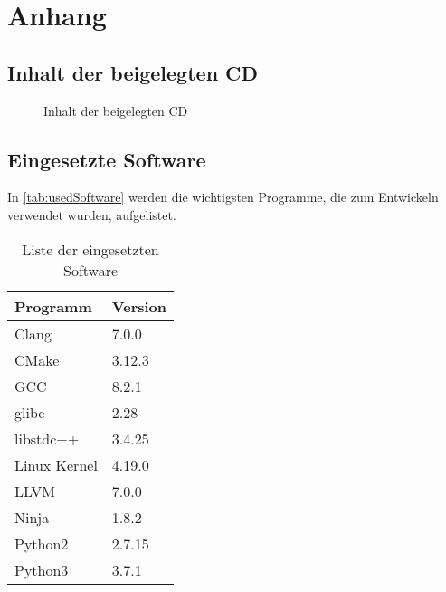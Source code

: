\section{Anhang}
\subsection*{Inhalt der beigelegten CD}
\begin{figure}[H]

\caption{Inhalt der beigelegten CD}
\label{fig:cd}
\end{figure}

\subsection*{Eingesetzte Software}

In \autoref{tab:usedSoftware} werden die wichtigsten Programme, die zum Entwickeln verwendet wurden, aufgelistet.

\begin{table}[H]
\centering
\caption{Liste der eingesetzten Software}
\label{tab:usedSoftware}
\begin{tabular}{ll}
\hline
Programm       & Version      \\ \hline
Clang          & 7.0.0        \\
CMake          & 3.12.3       \\
GCC            & 8.2.1        \\
glibc          & 2.28         \\
libstdc++      & 3.4.25       \\
Linux Kernel   & 4.19.0       \\
LLVM           & 7.0.0        \\
Ninja          & 1.8.2        \\
Python2        & 2.7.15       \\
Python3        & 3.7.1        \\ \hline

\end{tabular}
\end{table}


